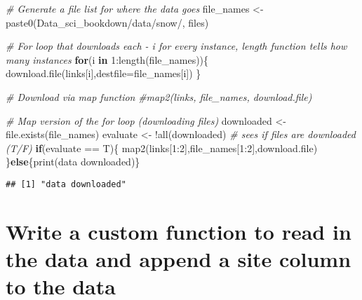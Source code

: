 \documentclass[
]{book}
\newenvironment{Shaded}{\begin{snugshade}}{\end{snugshade}}
\newcommand{\AttributeTok}[1]{\textcolor[rgb]{0.77,0.63,0.00}{#1}}
\newcommand{\CommentTok}[1]{\textcolor[rgb]{0.56,0.35,0.01}{\textit{#1}}}
\newcommand{\ControlFlowTok}[1]{\textcolor[rgb]{0.13,0.29,0.53}{\textbf{#1}}}
\newcommand{\DecValTok}[1]{\textcolor[rgb]{0.00,0.00,0.81}{#1}}
\newcommand{\FunctionTok}[1]{\textcolor[rgb]{0.00,0.00,0.00}{#1}}
\newcommand{\NormalTok}[1]{#1}
\newcommand{\OtherTok}[1]{\textcolor[rgb]{0.56,0.35,0.01}{#1}}
\newcommand{\SpecialCharTok}[1]{\textcolor[rgb]{0.00,0.00,0.00}{#1}}
\newcommand{\StringTok}[1]{\textcolor[rgb]{0.31,0.60,0.02}{#1}}
\begin{document}
\begin{Shaded}
\begin{Highlighting}[]
\CommentTok{\# Generate a file list for where the data goes}
\NormalTok{file\_names }\OtherTok{\textless{}{-}} \FunctionTok{paste0}\NormalTok{(}\StringTok{\textquotesingle{}Data\_sci\_bookdown/data/snow/\textquotesingle{}}\NormalTok{, files)}

\CommentTok{\# For loop that downloads each {-} i for every instance, length function tells how many instances}
\ControlFlowTok{for}\NormalTok{(i }\ControlFlowTok{in} \DecValTok{1}\SpecialCharTok{:}\FunctionTok{length}\NormalTok{(file\_names))\{}
  \FunctionTok{download.file}\NormalTok{(links[i],}\AttributeTok{destfile=}\NormalTok{file\_names[i])}
\NormalTok{\}}

\CommentTok{\# Download via map function}
\CommentTok{\#map2(links, file\_names, download.file)}

\CommentTok{\# Map version of the for loop (downloading files)}
\NormalTok{downloaded }\OtherTok{\textless{}{-}} \FunctionTok{file.exists}\NormalTok{(file\_names) }
\NormalTok{evaluate }\OtherTok{\textless{}{-}} \SpecialCharTok{!}\FunctionTok{all}\NormalTok{(downloaded) }\CommentTok{\# sees if files are downloaded (T/F)}
\ControlFlowTok{if}\NormalTok{(evaluate }\SpecialCharTok{==}\NormalTok{ T)\{}
  \FunctionTok{map2}\NormalTok{(links[}\DecValTok{1}\SpecialCharTok{:}\DecValTok{2}\NormalTok{],file\_names[}\DecValTok{1}\SpecialCharTok{:}\DecValTok{2}\NormalTok{],download.file)}
\NormalTok{\}}\ControlFlowTok{else}\NormalTok{\{}\FunctionTok{print}\NormalTok{(}\StringTok{\textquotesingle{}data downloaded\textquotesingle{}}\NormalTok{)\}}
\end{Highlighting}
\end{Shaded}

\begin{verbatim}
## [1] "data downloaded"
\end{verbatim}

\hypertarget{write-a-custom-function-to-read-in-the-data-and-append-a-site-column-to-the-data}{%
\section{Write a custom function to read in the data and append a site column to the data}\label{write-a-custom-function-to-read-in-the-data-and-append-a-site-column-to-the-data}}
\end{document}
